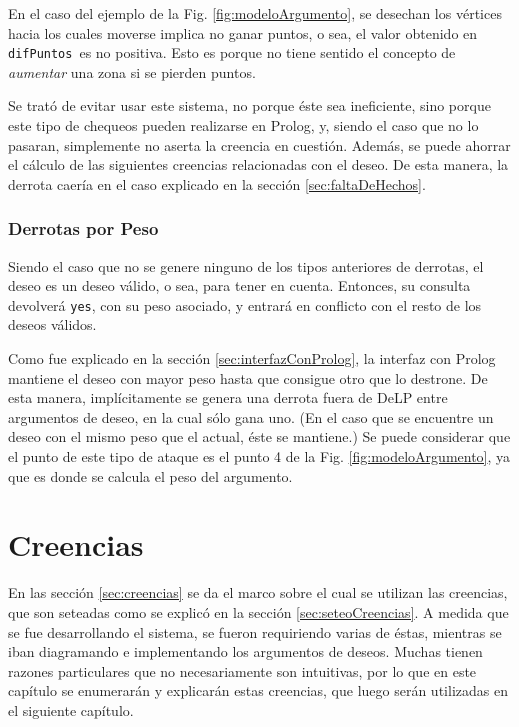 \documentclass[oneside]{book}
\begin{document}
En el caso del ejemplo de la Fig.
\ref{fig:modeloArgumento}, se desechan los vértices hacia los cuales moverse 
implica no ganar puntos, o sea, el valor obtenido en \texttt{difPuntos}\ es no
positiva. Esto es porque no tiene sentido el concepto de \emph{aumentar} una zona
si se pierden puntos.

Se trató de evitar usar este sistema, no porque éste sea ineficiente, sino 
porque este tipo de chequeos pueden realizarse en Prolog, y, siendo el caso que
no lo pasaran, simplemente no aserta la creencia en cuestión. Además, se puede
ahorrar el cálculo de las siguientes creencias relacionadas con el deseo. De esta
manera, la derrota caería en el caso explicado en la sección 
\ref{sec:faltaDeHechos}.

\subsection{Derrotas por Peso}

Siendo el caso que no se genere ninguno de los tipos anteriores de derrotas, el
deseo es un deseo válido, o sea, para tener en cuenta. Entonces, su consulta 
devolverá \texttt{yes}, con su peso asociado, y entrará en conflicto con el resto
de los deseos válidos.

Como fue explicado en la sección \ref{sec:interfazConProlog}, la interfaz con 
Prolog mantiene el deseo con mayor peso hasta que consigue otro que lo destrone.
De esta manera, implícitamente se genera una derrota fuera de DeLP entre 
argumentos de deseo, en la cual sólo gana uno. (En el caso que se encuentre un 
deseo con el mismo peso que el actual, éste se mantiene.) Se puede considerar
que el punto de este tipo de ataque es el punto 4 de la Fig. 
\ref{fig:modeloArgumento}, ya que es donde se calcula el peso del argumento.






\chapter{Creencias}

En las sección \ref{sec:creencias} se da el marco
sobre el cual se utilizan las creencias, que son seteadas como se explicó en la sección
\ref{sec:seteoCreencias}.
A medida que se fue desarrollando el sistema, se fueron requiriendo varias de éstas,
mientras se iban diagramando e implementando los argumentos de deseos. Muchas tienen
razones particulares que no necesariamente son intuitivas, por lo que en este capítulo
se enumerarán y explicarán estas creencias, que luego serán utilizadas en el siguiente
capítulo.
\end{document}
